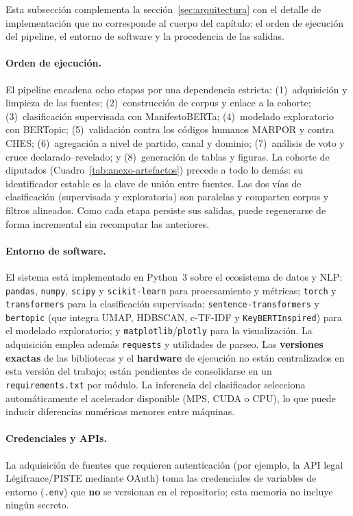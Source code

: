 Esta subsección complementa la sección~\ref{sec:arquitectura} con el detalle de
implementación que no corresponde al cuerpo del capítulo: el orden de ejecución
del pipeline, el entorno de software y la procedencia de las salidas.

\paragraph{Orden de ejecución.} El pipeline encadena ocho etapas por una
dependencia estricta: (1)~adquisición y limpieza de las fuentes;
(2)~construcción de corpus y enlace a la cohorte; (3)~clasificación supervisada
con ManifestoBERTa; (4)~modelado exploratorio con BERTopic; (5)~validación contra
los códigos humanos MARPOR y contra CHES; (6)~agregación a nivel de partido,
canal y dominio; (7)~análisis de voto y cruce declarado--revelado; y
(8)~generación de tablas y figuras. La cohorte de diputados
(Cuadro~\ref{tab:anexo-artefactos}) precede a todo lo demás: su identificador
estable es la clave de unión entre fuentes. Las dos vías de clasificación
(supervisada y exploratoria) son paralelas y comparten corpus y filtros
alineados. Como cada etapa persiste sus salidas, puede regenerarse de forma
incremental sin recomputar las anteriores.

\paragraph{Entorno de software.} El sistema está implementado en Python~3 sobre
el ecosistema de datos y NLP: \texttt{pandas}, \texttt{numpy}, \texttt{scipy} y
\texttt{scikit-learn} para procesamiento y métricas; \texttt{torch} y
\texttt{transformers} para la clasificación supervisada; \texttt{sentence-transformers}
y \texttt{bertopic} (que integra UMAP, HDBSCAN, c-TF-IDF y \texttt{KeyBERTInspired})
para el modelado exploratorio; y \texttt{matplotlib}/\texttt{plotly} para la
visualización. La adquisición emplea además \texttt{requests} y utilidades de
parseo. Las \textbf{versiones exactas} de las bibliotecas y el \textbf{hardware}
de ejecución no están centralizados en esta versión del trabajo; están pendientes
de consolidarse en un \texttt{requirements.txt} por módulo. La inferencia del clasificador selecciona automáticamente el
acelerador disponible (MPS, CUDA o CPU), lo que puede inducir diferencias
numéricas menores entre máquinas.

\paragraph{Credenciales y APIs.} La adquisición de fuentes que requieren
autenticación (por ejemplo, la API legal Légifrance/PISTE mediante OAuth) toma
las credenciales de variables de entorno (\texttt{.env}) que \textbf{no} se
versionan en el repositorio; esta memoria no incluye ningún secreto.

